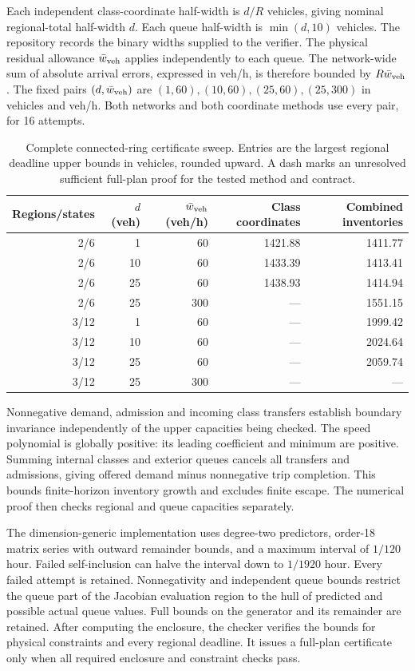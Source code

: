 \documentclass[preprint,12pt]{elsarticle}
\begin{document}
Each independent class-coordinate half-width is $d/R$ vehicles, giving nominal
regional-total half-width $d$. Each queue half-width is $\min(d,10)$ vehicles.
The repository records the binary widths supplied to the verifier. The physical
residual allowance $\bar w_{\rm veh}$ applies independently to each queue.
The network-wide sum of absolute arrival errors, expressed in veh/h,
is therefore bounded by $R\bar w_{\rm veh}$. The fixed pairs
$(d,\bar w_{\rm veh})$ are $(1,60),(10,60),(25,60),(25,300)$ in vehicles and veh/h.
Both networks and both coordinate methods use every pair, for 16 attempts.
\begin{table}[t]
\centering\small
\caption{Complete connected-ring certificate sweep. Entries are the largest
regional deadline upper bounds in vehicles, rounded upward. A dash marks an
unresolved sufficient full-plan proof for the tested method and contract.}
\label{tab:network-transfer-complete}
\setlength{\tabcolsep}{4pt}
\begin{tabular}{@{}rrrrr@{}}
\toprule
Regions/states & $d$ (veh) & $\bar w_{\rm veh}$ (veh/h) & Class coordinates & Combined inventories\\
\midrule
2/6 & 1 & 60 & 1421.88 & 1411.77\\
2/6 & 10 & 60 & 1433.39 & 1413.41\\
2/6 & 25 & 60 & 1438.93 & 1414.94\\
2/6 & 25 & 300 & --- & 1551.15\\
3/12 & 1 & 60 & --- & 1999.42\\
3/12 & 10 & 60 & --- & 2024.64\\
3/12 & 25 & 60 & --- & 2059.74\\
3/12 & 25 & 300 & --- & ---\\
\bottomrule
\end{tabular}
\end{table}

Nonnegative demand, admission and incoming class transfers establish boundary
invariance independently of the upper capacities being checked. The speed
polynomial is globally positive: its leading coefficient and minimum are
positive. Summing internal classes and exterior queues cancels all transfers
and admissions, giving offered demand minus nonnegative trip completion.
This bounds finite-horizon inventory growth and excludes finite escape.
The numerical proof then checks regional and queue capacities separately.

The dimension-generic implementation uses degree-two predictors, order-18
matrix series with outward remainder bounds, and a maximum interval of
$1/120$ hour. Failed self-inclusion can halve the interval down to $1/1920$
hour. Every failed attempt is retained. Nonnegativity and independent queue bounds restrict the queue part of the
Jacobian evaluation region to the hull of predicted and possible actual
queue values. Full bounds on the generator and its remainder are retained. After computing the enclosure, the checker verifies the bounds for physical
constraints and every regional deadline. It issues a full-plan certificate
only when all required enclosure and constraint checks pass.
\end{document}
